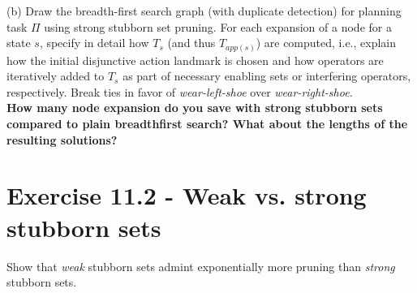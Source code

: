 \documentclass[11pt,a4paper]{article}
\begin{document}
(b) Draw the breadth-first search graph (with duplicate detection) for planning task $\Pi$ using
strong stubborn set pruning. For each expansion of a node for a state $s$, specify in detail how
$T_s$ (and thus $T_{app(s)}$) are computed, i.e., explain how the initial disjunctive action landmark
is chosen and how operators are iteratively added to $T_s$ as part of necessary enabling sets or
interfering operators, respectively. Break ties in favor of \emph{wear-left-shoe} over \emph{wear-right-shoe.}\\

\textbf{How many node expansion do you save with strong stubborn sets compared to plain breadthfirst search?
 What about the lengths of the resulting solutions?}\\

\begin{center}
\end{center}

\section*{Exercise 11.2 - Weak vs. strong stubborn sets}
Show that \emph{weak} stubborn sets admint exponentially more pruning than
\emph{strong} stubborn sets.\\
\end{document}
